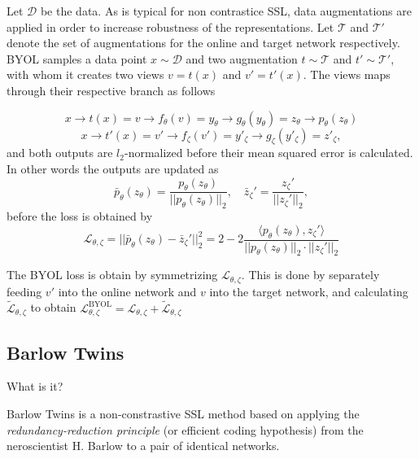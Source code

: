\documentclass[../../thesis.tex]{subfiles}
\begin{document}
Let $\mathcal{D}$ be the data. As is typical for non contrastice SSL, data augmentations are applied in order to increase robustness of the representations. Let $\mathcal{T}$  and $\mathcal{T'}$ denote the set of augmentations for the online and target network respectively. BYOL samples a data point $x\sim \mathcal{D}$ and two augmentation $t\sim \mathcal{T}$ and $t'\sim \mathcal{T'}$, with whom it creates two views $v = t(x)$ and $v' = t'(x)$. The views maps through their respective branch as follows

\begin{equation}
    x \to t(x) = v \to f_\theta(v) = y_\theta \to g_\theta (y_\theta) = z_\theta \to p_\theta(z_\theta)
\end{equation}
\begin{equation}
    x \to t'(x) = v' \to f_\zeta(v') = y'_\zeta \to g_\zeta (y'_\zeta) = z'_\zeta,
\end{equation}
and both outputs are $l_2$-normalized before their mean squared error is calculated. In other words the outputs are updated as
\begin{equation}
    \bar{p}_\theta(z_\theta) = \frac{p_\theta(z_\theta)}{||p_\theta(z_\theta)||_2}, \quad \bar{z}_\zeta' = \frac{z_\zeta'}{||z_\zeta'||_2},
\end{equation}
before the loss is obtained by 
\begin{equation}
    \mathcal{L}_{\theta,\zeta} = ||\bar{p}_\theta(z_\theta) - \bar{z}_\zeta'||_2^2 = 2-2 \frac{\langle p_\theta(z_\theta), z_\zeta'\rangle}{||p_\theta(z_\theta)||_2\cdot||z_\zeta'||_2}
\end{equation}

The BYOL loss is obtain by symmetrizing $\mathcal{L}_{\theta,\zeta}$. This is done by separately feeding $v'$ into the online network and $v$ into the target network, and calculating $\mathcal{\tilde{L}}_{\theta,\zeta}$ to obtain $\mathcal{L}^{\text{BYOL}}_{\theta,\zeta} = \mathcal{L}_{\theta,\zeta} + \mathcal{\tilde{L}}_{\theta,\zeta}$






\subsection{Barlow Twins}
What is it?

Barlow Twins is a non-constrastive SSL method based on applying the \textit{redundancy-reduction principle} (or efficient coding hypothesis) \cite{Barlow_origin} from the neroscientist H. Barlow to a pair of identical networks. 
\end{document}
